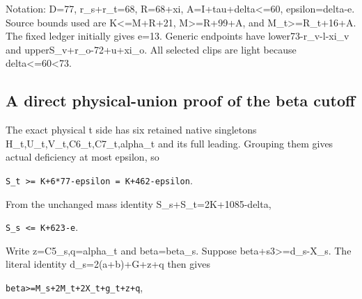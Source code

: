 \documentclass[10pt,a4paper]{article}
\theoremstyle{definition}
\begin{document}
Notation: \textbar D\textbar=\allowbreak{}77,\allowbreak{} r\_\allowbreak{}s+\allowbreak{}r\_\allowbreak{}t=\allowbreak{}68,\allowbreak{} R=\allowbreak{}68+\allowbreak{}xi,\allowbreak{}
A=\allowbreak{}I+\allowbreak{}tau+\allowbreak{}delta\textless=\allowbreak{}60,\allowbreak{} epsilon=\allowbreak{}delta-e. Source bounds used are
K\textless=\allowbreak{}M+\allowbreak{}R+\allowbreak{}21,\allowbreak{} M\textgreater=\allowbreak{}R+\allowbreak{}99+\allowbreak{}A,\allowbreak{} and M\_\allowbreak{}t\textgreater=\allowbreak{}R\_\allowbreak{}t+\allowbreak{}16+\allowbreak{}A.
The fixed ledger initially gives e=\allowbreak{}13. Generic endpoints have
lower73-r\_\allowbreak{}v-l-xi\_\allowbreak{}v and upperS\_\allowbreak{}v+\allowbreak{}r\_\allowbreak{}o-72+\allowbreak{}u+\allowbreak{}xi\_\allowbreak{}o. All selected clips
are light because delta\textless=\allowbreak{}60\textless73.

\hypertarget{a-direct-physical-union-proof-of-the-beta-cutoff}{%
\subsection{A direct physical-union proof of the beta
cutoff}\label{a-direct-physical-union-proof-of-the-beta-cutoff}}

The exact physical t side has six retained native singletons
H\_\allowbreak{}t,\allowbreak{}U\_\allowbreak{}t,\allowbreak{}V\_\allowbreak{}t,\allowbreak{}C6\_\allowbreak{}t,\allowbreak{}C7\_\allowbreak{}t,\allowbreak{}alpha\_\allowbreak{}t and its full leading. Grouping them
gives actual deficiency at most epsilon,\allowbreak{} so

\texttt{S\_\allowbreak{}\allowbreak{}t >=\allowbreak{} K+\allowbreak{}6*77-epsilon =\allowbreak{} K+\allowbreak{}462-epsilon}.

From the unchanged mass identity S\_\allowbreak{}s+\allowbreak{}S\_\allowbreak{}t=\allowbreak{}2K+\allowbreak{}1085-delta,\allowbreak{}

\texttt{S\_\allowbreak{}\allowbreak{}s <=\allowbreak{} K+\allowbreak{}623-e}.

Write z=\allowbreak{}C5\_\allowbreak{}s,\allowbreak{}q=\allowbreak{}alpha\_\allowbreak{}t and beta=\allowbreak{}beta\_\allowbreak{}s. Suppose
beta+\allowbreak{}s3\textgreater=\allowbreak{}d\_\allowbreak{}s-X\_\allowbreak{}s. The literal identity d\_\allowbreak{}s=\allowbreak{}2(a+\allowbreak{}b)+\allowbreak{}G+\allowbreak{}z+\allowbreak{}q
then gives

\texttt{beta>=\allowbreak{}M\_\allowbreak{}\allowbreak{}s+\allowbreak{}2M\_\allowbreak{}\allowbreak{}t+\allowbreak{}2X\_\allowbreak{}\allowbreak{}t+\allowbreak{}g\_\allowbreak{}\allowbreak{}t+\allowbreak{}z+\allowbreak{}q},\allowbreak{}
\end{document}
